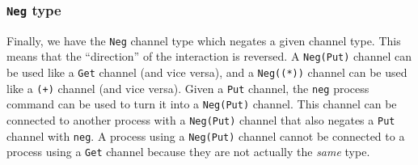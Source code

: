 \documentclass[11pt]{article}
\begin{document}
%

\subsubsection{\lstinline$Neg$ type}

Finally, we have the \lstinline$Neg$ channel type which negates a given channel type.
This means that the ``direction'' of the interaction is reversed.
A \lstinline$Neg(Put)$ channel can be used like a \lstinline$Get$ channel (and vice versa), and a \lstinline$Neg((*))$ channel can be used like a \lstinline$(+)$ channel (and vice versa).
Given a \lstinline$Put$ channel, the \lstinline$neg$ process command can be used to turn it into a \lstinline$Neg(Put)$ channel.
This channel can be connected to another process with a \lstinline$Neg(Put)$ channel that also negates a \lstinline$Put$ channel with \lstinline$neg$.
A process using a \lstinline$Neg(Put)$ channel cannot be connected to a process using a \lstinline$Get$ channel because they are not actually the {\em same} type.
\end{document}
